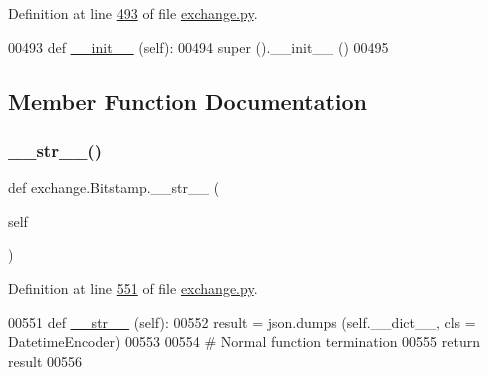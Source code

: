 Definition at line \hyperlink{exchange_8py_source_l00493}{493} of file \hyperlink{exchange_8py_source}{exchange.\+py}.


\begin{DoxyCode}
00493     \textcolor{keyword}{def }\hyperlink{namespacestart__time_a9c9bd378729a13c96a22c8b079ea172c}{\_\_init\_\_} (self):
00494         super ().\_\_init\_\_ ()
00495  
\end{DoxyCode}


\subsection{Member Function Documentation}
\mbox{\label{classexchange_1_1_bitstamp_a26c84c8299dc2c2ab6eec840f0a73db6}} 
\subsubsection{\texorpdfstring{\+\_\+\+\_\+str\+\_\+\+\_\+()}{\_\_str\_\_()}}
{\footnotesize\ttfamily def exchange.\+Bitstamp.\+\_\+\+\_\+str\+\_\+\+\_\+ (\begin{DoxyParamCaption}\item[{}]{self }\end{DoxyParamCaption})}



Definition at line \hyperlink{exchange_8py_source_l00551}{551} of file \hyperlink{exchange_8py_source}{exchange.\+py}.


\begin{DoxyCode}
00551     \textcolor{keyword}{def }\hyperlink{namespacerates_a2f1a70c33ee9e255938e4c19fd207264}{\_\_str\_\_} (self):
00552         result = json.dumps (self.\_\_dict\_\_, cls = DatetimeEncoder)
00553         
00554         \textcolor{comment}{# Normal function termination}
00555         \textcolor{keywordflow}{return} result       
00556         
\end{DoxyCode}
\mbox{\label{classexchange_1_1_bitstamp_a5305133e32d2621f0d7dcd337eb00264}} 
